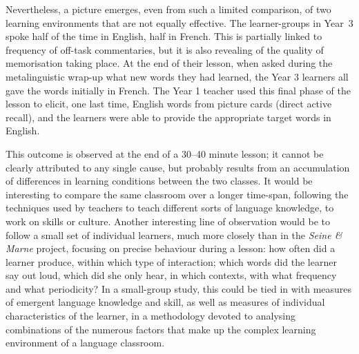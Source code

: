 \documentclass[output=paper,colorlinks,citecolor=brown,modfonts,nonflat]{../langscibook}
\begin{document}
Nevertheless, a picture emerges, even from such a limited comparison, of two learning environments that are not equally effective. The learner-groups in Year~3 spoke half of the time in English, half in French. This is partially linked to frequency of off-task commentaries, but it is also revealing of the quality of memorisation taking place. At the end of their lesson, when asked during the metalinguistic wrap-up what new words they had learned, the Year 3 learners all gave the words initially in French. The Year 1 teacher used this final phase of the lesson to elicit, one last time, English words from picture cards (direct active recall), and the learners were able to provide the appropriate target words in English.

This outcome is observed at the end of a 30--40 minute lesson; it cannot be clearly attributed to any single cause, but probably results from an accumulation of differences in learning conditions between the two classes. It would be interesting to compare the same classroom over a longer time-span, following the techniques used by teachers to teach different sorts of language knowledge, to work on skills or culture. Another interesting line of observation would be to follow a small set of individual learners, much more closely than in the \textit{Seine \& Marne} project, focusing on precise behaviour during a lesson: how often did a learner produce, within which type of interaction; which words did the learner say out loud, which did she only hear, in which contexts, with what frequency and what periodicity? In a small-group study, this could be tied in with measures of emergent language knowledge and skill, as well as measures of individual characteristics of the learner, in a methodology devoted to analysing combinations of the numerous factors that make up the complex learning environment of a language classroom.

{\sloppy\printbibliography[heading=subbibliography,notkeyword=this]}
\end{document}
